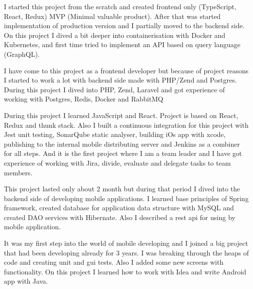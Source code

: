 \documentclass[11pt,a4paper,sans]{moderncv} %
\begin{document}
{I started this project from the scratch and created frontend only (TypeScript, React, Redux) MVP (Minimal valuable product). After that was started implementation of production version and I partially moved to the backend side. On this project I dived a bit deeper into containerisation with Docker and Kubernetes, and first time tried to implement an API based on query language (GraphQL). }

{I have come to this project as a frontend developer but because of project reasons I started to work a lot with backend side made with PHP/Zend and Postgres. During this project I dived into PHP, Zend, Laravel and got experience of working with Postgres, Redis, Docker and RabbitMQ}

{During this project I learned JavaScript and React. Project is based on React, Redux and thunk stack. Also I built a continuous integration for this project with Jest unit testing, SonarQube static analyser, building iOs app with xcode, publishing to the internal mobile distributing server and Jenkins as a combiner for all steps. And it is the first project where I am a team leader and I have got experience of working with Jira, divide, evaluate and delegate tasks to team members.}

{This project lasted only about 2 month but during that period I dived into the backend side of developing mobile applications. I learned base principles of Spring framework, created database for application data structure with MySQL and created DAO services with Hibernate. Also I described a rest api for using by mobile application.}

{It was my first step into the world of mobile developing and I joined a big project that had been developing already for 3 years. I was breaking through the heaps of code and creating unit and gui tests. Also I added some new screens with functionality. On this project I learned how to work with Idea and write Android app with Java.}
\end{document}
